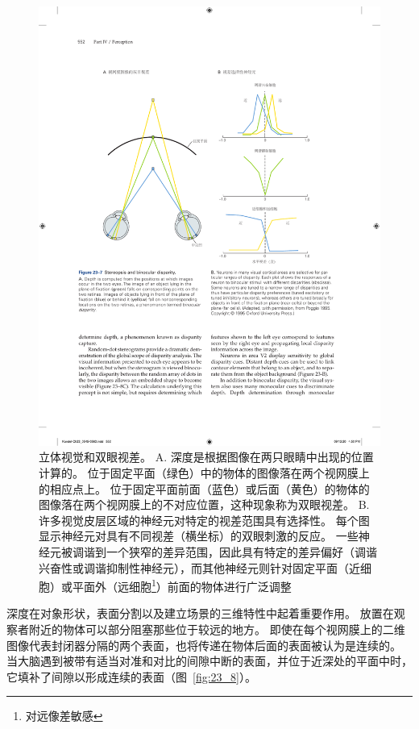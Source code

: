 \begin{figure}[htbp]
	\centering
	\includegraphics[width=0.75\linewidth]{chap23/fig_23_7}
	\caption{立体视觉和双眼视差。
		A. 深度是根据图像在两只眼睛中出现的位置计算的。
		位于固定平面（绿色）中的物体的图像落在两个视网膜上的相应点上。
		位于固定平面前面（蓝色）或后面（黄色）的物体的图像落在两个视网膜上的不对应位置，这种现象称为双眼视差。
		B. 许多视觉皮层区域的神经元对特定的视差范围具有选择性。
		每个图显示神经元对具有不同视差（横坐标）的双眼刺激的反应。
		一些神经元被调谐到一个狭窄的差异范围，因此具有特定的差异偏好（调谐兴奋性或调谐抑制性神经元），而其他神经元则针对固定平面（近细胞）或平面外（远细胞\footnote{对远像差敏感}）前面的物体进行广泛调整\cite{poggio1995mechanisms}}
	\label{fig:23_7}
\end{figure}



深度在对象形状，表面分割以及建立场景的三维特性中起着重要作用。
放置在观察者附近的物体可以部分阻塞那些位于较远的地方。
即使在每个视网膜上的二维图像代表封闭器分隔的两个表面，也将传递在物体后面的表面被认为是连续的。
当大脑遇到被带有适当对准和对比的间隙中断的表面，并位于近深处的平面中时，它填补了间隙以形成连续的表面（图~\ref{fig:23_8}）。


